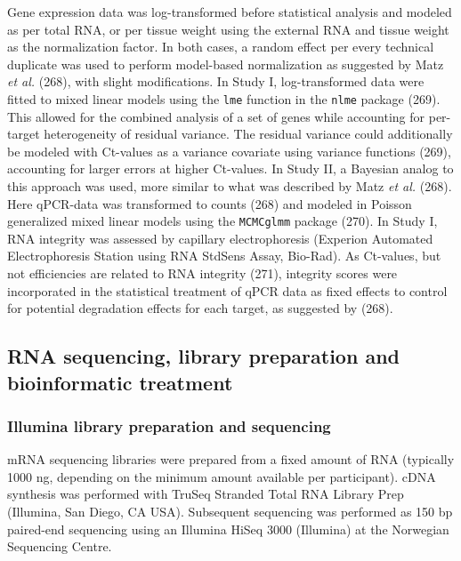 \documentclass[twoside,10pt]{gihclass} %
\begin{document}
Gene expression data was log-transformed before statistical analysis and modeled as per total RNA,
or per tissue weight using the external RNA and tissue weight as the normalization factor.
In both cases, a random effect per every technical duplicate was used to perform model-based normalization as suggested by Matz \emph{et al.}
(268), with slight modifications. In Study I, log-transformed data were fitted to mixed linear models using the \texttt{lme} function in the \texttt{nlme} package
(269).
This allowed for the combined analysis of a set of genes while accounting for per-target heterogeneity of residual variance. The residual variance could additionally be modeled with Ct-values as a variance covariate using variance functions
(269),
accounting for larger errors at higher Ct-values.
In Study II, a Bayesian analog to this approach was used, more similar to what was described by Matz \emph{et al.}
(268).
Here qPCR-data was transformed to counts (268) and modeled in Poisson generalized mixed linear models using the \texttt{MCMCglmm} package
(270).
In Study I, RNA integrity was assessed by capillary electrophoresis (Experion Automated Electrophoresis Station using RNA StdSens Assay, Bio-Rad).
As Ct-values, but not efficiencies are related to RNA integrity (271),
integrity scores were incorporated in the statistical treatment of qPCR data as fixed effects to control for potential degradation effects for each target, as suggested by
(268).

\hypertarget{rna-sequencing-library-preparation-and-bioinformatic-treatment}{%
\subsection{RNA sequencing, library preparation and bioinformatic treatment}\label{rna-sequencing-library-preparation-and-bioinformatic-treatment}}

\hypertarget{illumina-library-preparation-and-sequencing}{%
\subsubsection{Illumina library preparation and sequencing}\label{illumina-library-preparation-and-sequencing}}

mRNA sequencing libraries were prepared from a fixed amount of RNA (typically 1000 ng, depending on the minimum amount available per participant). cDNA synthesis was performed with TruSeq Stranded Total RNA Library Prep (Illumina, San Diego, CA USA). Subsequent sequencing was performed as 150 bp paired-end sequencing using an Illumina HiSeq 3000 (Illumina) at the Norwegian Sequencing Centre.
\end{document}
